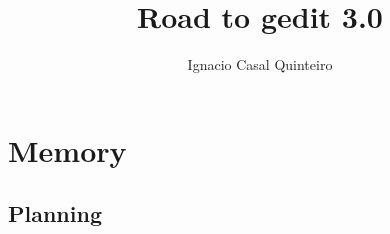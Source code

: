 \documentclass[a4paper,11pt,twoside]{book}
\author{Ignacio Casal Quinteiro}
\title{\textbf{\Huge{Road to gedit 3.0}}}
\begin{document}

\newcommand{\addwrapfigure}[4][\textwidth]{
  \begin{wrapfigure}{#2}{#1}
    \vspace{-20pt}
    \begin{center}
      \texttt{[image: \#3]}
    \end{center}
    \vspace{-20pt}
    \caption{#4}
    \vspace{-20pt}
  \end{wrapfigure}
}

\newcommand{\addfigure}[4][\textwidth]{
  \begin{figure}[ht]
    \begin{center}
      \texttt{[image: \#2]}
      \caption[#3]{#3}\label{#4}
    \end{center}
  \end{figure}
}

\newcommand{\GNOME}{\textsc{Gnome}~}


\newpage\thispagestyle{empty}
\cleardoublepage

\pagestyle{fancy}
\fancyhf{}
\fancyhf[HR]{\thepage}
\fancyhf[HL]{\nouppercase\rightmark}

\frontmatter

\tableofcontents
\listoffigures
\listoftables
\newpage\thispagestyle{empty}
\cleardoublepage

\mainmatter

\part{Memory}






\chapter{Planning}





\end{document}
